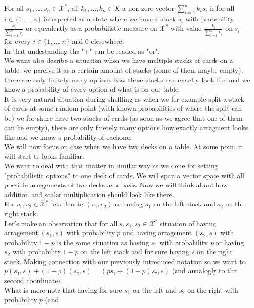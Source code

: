 \documentclass[a4paper]{article}
\begin{document}
For all $s_1, \dots, s_n \in \mathcal{X}^*$, all $k_1, \dots, k_n \in K$ a non-zero vector 
$\displaystyle\sum^{n}_{i = 1} k_is_i$ is for all $i \in \{1, \dots, n\}$ 
interpreted as a state where we have a stack $s_i$ with probability $\frac{k_i}{\sum^n_{i=1} k_i}$ or 
equvalently as a probabilistic measure on $\mathcal{X}^*$ with value $\frac{k_i}{\sum^n_{i=1} k_i}$ on $s_i$ 
for every $i \in \{1, \dots, n\}$ and $0$ elesewhere. \\
In that undestanding the "+" can be readed as "or". \\
We want also desribe a situation when we have multiple stacks of cards on a table, we percive it as a certain 
amount of stacks (some of them maybe empty), there are only finitely many options how 
these stacks can exactly look like and we know a probability of every option of what is on our table.\\ 
It is very natural situation during shuffling as when we for example split a stack of cards at some 
random point (with known probabilities of where the split can be) 
we for shure have two stacks of cards (as soon as we agree that one of them can be empty), 
there are only finetely many options how exactly arragment looks like and we know a probability of eachone. \\
We will now focus on case when we have two decks on a table. At some point it will start to looks familiar.\\
We want to deal with that matter in similar way as we done for setting "probabilistic options" to one deck 
of cards. We will span a vector space with all possible arregements of two decks as a basis. Now we will think 
about how addition and scalar multiplication should look like there. \\
For $s_1, s_2 \in \mathcal{X}^*$ lets denote $(s_1, s_2)$ as having $s_1$ on the left stack and $s_2$ 
on the right stack. \\ 
Let's make an observation that for all $s, s_1, s_2 \in \mathcal{X}^*$ situation of having arragement 
$(s_1, s)$ with probability $p$ and having arragement $(s_2, s)$ with probability $1-p$ is 
the same situation as having $s_1$ with probability $p$ or having $s_2$ with probability $1 - p$ on the left 
stack and for sure having $s$ on the right stack. Making connection with our previously introduced notation 
so we want to $p(s_1, s) + (1-p)(s_2, s) = (ps_1 + (1-p)s_2, s)$ (and annalogly to the second coordinate).\\
What is more note that having for sure $s_1$ on the left and $s_2$ on the right with probability $p$ (and 
\end{document}
